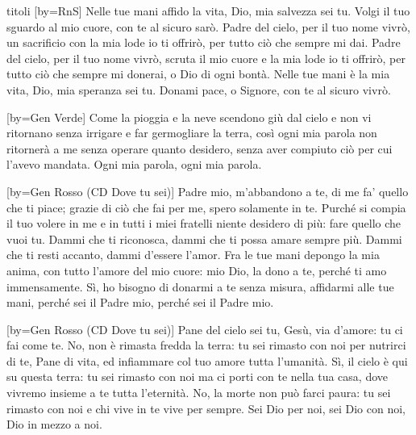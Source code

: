 \begin{songs}{titoli}
[by={RnS}]
\beginverse
Nelle tue mani affido la vita, Dio, mia salvezza sei tu.
Volgi il tuo sguardo al mio cuore, con te al sicuro sarò.
\endverse
\beginchorus
Padre del cielo, per il tuo nome vivrò,
un sacrificio con la mia lode io ti offrirò,
per tutto ciò che sempre mi dai.
Padre del cielo, per il tuo nome vivrò,
scruta il mio cuore e la mia lode io ti offrirò,
per tutto ciò che sempre mi donerai,
o Dio di ogni bontà.
\endchorus
\beginverse
Nelle tue mani è la mia vita, Dio, mia speranza sei tu.
Donami pace, o Signore, con te al sicuro vivrò.
\endverse
\endsong

[by={Gen Verde}]
\beginverse
Come la pioggia e la neve
scendono giù dal cielo
e non vi ritornano senza irrigare
e far germogliare la terra,
così ogni mia parola non ritornerà a me
senza operare quanto desidero,
senza aver compiuto ciò per cui l'avevo mandata.
Ogni mia parola, ogni mia parola.
\endverse
\endsong

[by={Gen Rosso (CD Dove tu sei)}]
\beginverse
Padre mio, m'abbandono a te, di me fa' quello che ti piace;
grazie di ciò che fai per me,
spero solamente in te.
Purché si compia il tuo volere in me e in tutti i miei fratelli
niente desidero di più:
fare quello che vuoi tu.
\endverse
\beginchorus
Dammi che ti riconosca, dammi che ti possa amare sempre più.
Dammi che ti resti accanto, dammi d'essere l'amor.
\endchorus
\beginverse
Fra le tue mani depongo la mia anima, con tutto l'amore del mio cuore:
mio Dio, la dono a te,
perché ti amo immensamente.
Sì, ho bisogno di donarmi a te senza misura, affidarmi alle tue mani,
perché sei il Padre mio,
perché sei il Padre mio.
\endverse
\endsong

[by={Gen Rosso (CD Dove tu sei)}]
\beginchorus
Pane del cielo sei tu, Gesù,
via d'amore: tu ci fai come te. 
\endchorus
\beginverse
No, non è rimasta fredda la terra:
tu sei rimasto con noi
per nutrirci di te,
Pane di vita,
ed infiammare col tuo amore
tutta l'umanità.
\endverse
\beginverse
Sì, il cielo è qui su questa terra:
tu sei rimasto con noi
ma ci porti con te
nella tua casa,
dove vivremo insieme a te
tutta l'eternità.
\endverse
\beginverse
No, la morte non può farci paura:
tu sei rimasto con noi
e chi vive in te
vive per sempre.
Sei Dio per noi, sei Dio con noi,
Dio in mezzo a noi.
\endverse
\endsong


\end{songs}
